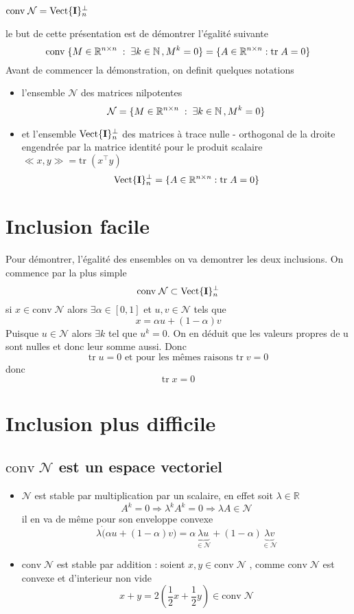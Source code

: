 \documentclass[10pt]{article}
\newcommand{\R}{\mathbb{R}}
\newcommand{\N}{\mathbb{N}}
\newcommand{\conv}{\mathrm{conv} \;}
\newcommand{\tr}{\mathrm{tr} \;}
\newcommand{\matr}[2]{\R^{#1 \times #2}}
\newcommand{\nilp}{\mathcal{N}}
\newcommand{\trnul}{\mathrm{Vect}\{{\bf I}\}_n^{\bot}}
\newcommand{\tran}{^{\top}}
\newcommand{\psf}[2]{\ll #1, #2 \gg}
\begin{document}
\begin{center}
{\bf \Large $ \conv \nilp = \trnul $}
\end{center}
le but de cette présentation est de démontrer l'égalité suivante
$$
\conv \{ M \in \matr{n}{n} \;:\; \exists k \in \N \, , \, \\ M^k = 0\} = \{A \in \matr{n}{n} : \tr A = 0  \}
$$
Avant de commencer la démonstration, on definit quelques notations

\begin{itemize} 
        \item l'ensemble $\nilp$ des matrices nilpotentes
$$
           \nilp =  \{ M \in \matr{n}{n} \;:\; \exists k \in \N \, , \, \\ M^k = 0\}
$$
   \item et l'ensemble $\trnul$ des matrices à trace nulle - orthogonal de la droite engendrée par la matrice identité pour le produit scalaire 
       $\psf{x}{y} = \tr (x\tran y)$
$$
\trnul = \{A \in \matr{n}{n} : \tr A = 0  \}
$$
\end{itemize}

\section{Inclusion facile}

Pour démontrer, l'égalité des ensembles on va demontrer les deux inclusions. On commence par la plus simple
$$
\conv \nilp \subset \trnul
$$
si $x \in \conv \nilp $ alors $\exists \alpha \in [0,1]$ et $u,v \in \nilp$ tels que
$$
x = \alpha u + (1-\alpha) v
$$
Puisque $u \in \nilp$ alors $\exists k$ tel que $u^k = 0$. On en déduit que les valeurs propres de u sont nulles et donc leur somme aussi.
Donc
$$
\tr u = 0  \mbox { et pour les mêmes raisons } \tr v = 0
$$
donc
$$
\tr x = 0
$$
\section{Inclusion plus difficile}

\subsection{$\conv \nilp$ est un espace vectoriel}
\begin{itemize}
    \item $\nilp$ est stable par multiplication par un scalaire, en effet soit $\lambda \in \R$
$$
A^k = 0 \Rightarrow \lambda^k A^k = 0 \Rightarrow \lambda A \in \nilp
$$
  il en va de même pour son enveloppe convexe
$$
\lambda \dot ( \alpha u + (1-\alpha) v ) = \alpha \underbrace{\lambda u}_{\in \nilp}  + (1- \alpha) \underbrace{\lambda v}_{\in \nilp}
$$
   \item $\conv \nilp $ est stable par addition :  soient $x,y \in \conv \nilp$ , comme $ \conv \nilp$ est convexe et d'interieur non vide
$$
        x + y = 2 \left(\frac{1}{2} x + \frac{1}{2} y \right)  \in \conv \nilp
$$
\end{itemize}
\end{document}
